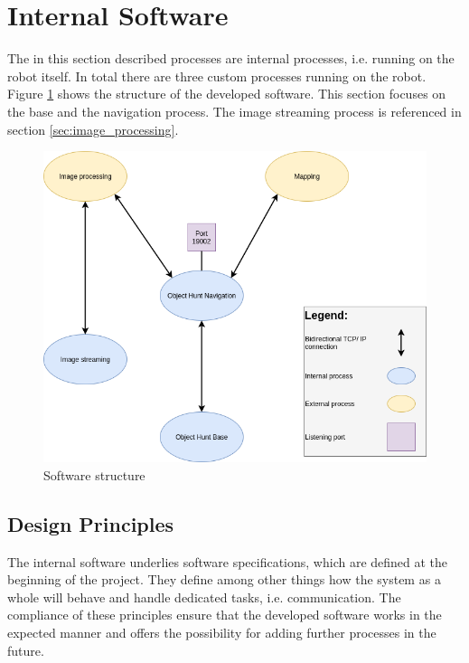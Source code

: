 \newpage

\section{Internal Software}

The in this section described processes are internal processes, i.e. running on the robot itself. In total there are three custom processes running on the robot. Figure \ref{fig:software} shows the structure of the developed software. This section focuses on the base and the navigation process. The image streaming process is referenced in section \ref{sec:image_processing}.

\begin{figure}[H]
\centering
\includegraphics[scale=0.6]{sources/software_structure.png}
\caption[Software structure]{Software structure}
\label{fig:software}
\end{figure}

\subsection{Design Principles}

The internal software underlies software specifications, which are defined at the beginning of the project. They define among other things how the system as a whole will behave and handle dedicated tasks, i.e. communication. The compliance of these principles ensure that the developed software works in the expected manner and offers the possibility for adding further processes in the future.

